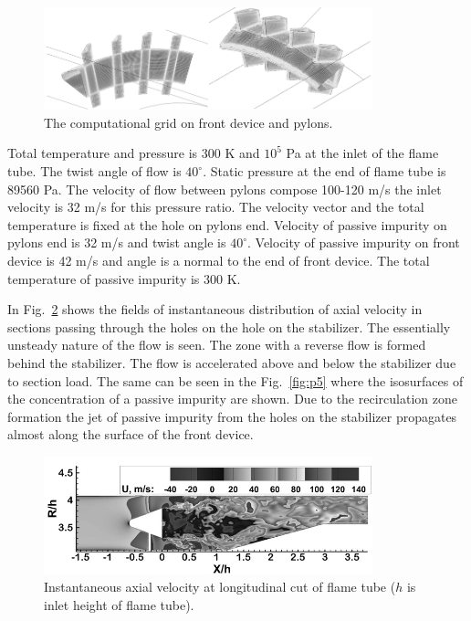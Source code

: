 \documentclass[
11pt,%
tightenlines,%
twoside,%
onecolumn,%
nofloats,%
nobibnotes,%
nofootinbib,%
superscriptaddress,%
noshowpacs,%
centertags]%
{revtex4}
\begin{document}
\begin{figure}[h]
\setcaptionmargin{5mm}
\onelinecaptionstrue
\includegraphics[width=0.85\textwidth]{pics/p3.png}
\caption{The computational grid on front device and pylons.}
\label{fig:p3}
\end{figure}

Total temperature and pressure is 300 K and $10^5$ Pa at the inlet of the flame tube.
The twist angle of flow is $40^{\circ}$.
Static pressure at the end of flame tube is 89560 Pa.
The velocity of flow between pylons compose 100-120 m/s the inlet velocity is 32 m/s for this pressure ratio.
The velocity vector and the total temperature is fixed at the hole on pylons end.
Velocity of passive impurity on pylons end is 32 m/s and twist angle is $40^{\circ}$.
Velocity of passive impurity on front device is 42 m/s and angle is a normal to the end of front device.
The total temperature of passive impurity is 300 K.

In Fig.~\ref{fig:p4} shows the fields of instantaneous distribution of axial velocity in sections passing through the holes on the hole on the stabilizer.
The essentially unsteady nature of the flow is seen.
The zone with a reverse flow is formed behind the stabilizer.
The flow is accelerated above and below the stabilizer due to section load.
The same can be seen in the Fig.~\ref{fig:p5} where the isosurfaces of the concentration of a passive impurity are shown.
Due to the recirculation zone formation the jet of passive impurity from the holes on the stabilizer propagates almost along the surface of the front device.

\begin{figure}[h]
\setcaptionmargin{5mm}
\onelinecaptionstrue
\includegraphics[width=0.85\textwidth]{pics/p4.png}
\caption{Instantaneous axial velocity at longitudinal cut of flame tube ($h$ is inlet height of flame tube).}
\label{fig:p4}
\end{figure}
\end{document}
